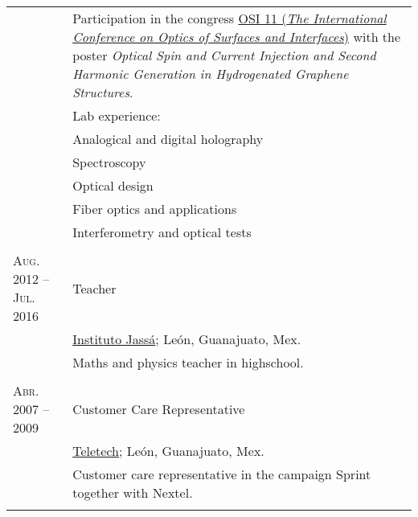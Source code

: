 \documentclass[letterpaper,10pt]{article}
\begin{document}
\begin{tabular}{R{4cm}|p{11cm}}
                        &   \footnotesize{Participation in the congress \href{http://www.osiconference.org/osi2015/index.php}{OSI 11 (\emph{The International Conference on Optics of Surfaces and Interfaces})} with the poster \emph{Optical Spin and Current Injection and Second Harmonic Generation in Hydrogenated Graphene Structures}.}\\
                        &   \footnotesize{Lab experience:}\\
                        &   \footnotesize{\qquad Analogical and digital holography}\\
                        &   \footnotesize{\qquad Spectroscopy}\\
                        &   \footnotesize{\qquad Optical design}\\
                        &   \footnotesize{\qquad Fiber optics and applications}\\
                        &   \footnotesize{\qquad Interferometry and optical tests}\\
                         \\
\textsc{Aug. 2012 -- Jul. 2016 }    &   Teacher \\
                        &   \href{http://www.institutojassa.edu.mx/}{Instituto Jass\'a}; Le\'on, Guanajuato, Mex.\\
                        &   \footnotesize{Maths and physics teacher in highschool. }\\
                         \\
\textsc{Abr. 2007 -- 2009}  &   Customer Care Representative\\
                        &   \href{http://www.teletech.com/worldwide/spanish}{Teletech}; Le\'on, Guanajuato, Mex.\\
                        &   \footnotesize{Customer care representative in the campaign Sprint together with Nextel.}\\
                             \\
\end{tabular}

\newpage
\end{document}
